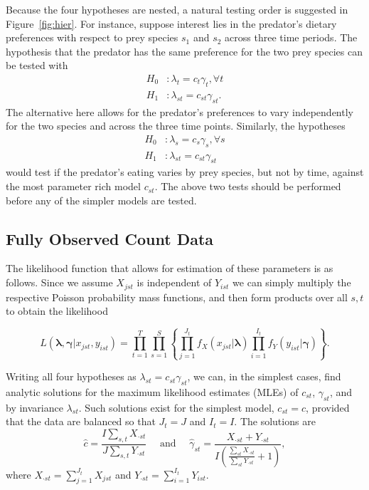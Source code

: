 \documentclass[smallextended]{svjour3}
\begin{document}
Because the four hypotheses are nested, a natural testing order is suggested in Figure~\ref{fig:hier}.  For instance, suppose interest lies in the predator's dietary preferences with respect to prey species $s_1$ and $s_2$ across three time periods.  The hypothesis that the predator has the same preference for the two prey species can be tested with
\begin{align*}
  H_0&: \lambda_t = c_t \gamma_t, \forall t \\  
  H_1&: \lambda_{st} = c_{st}\gamma_{st}.
\end{align*}
The alternative here allows for the predator's preferences to vary independently for the two species and across the three time points. Similarly, the hypotheses
\begin{align*}
  H_0&: \lambda_s = c_s \gamma_s, \forall s \\  
  H_1&: \lambda_{st} = c_{st}\gamma_{st}
\end{align*}
would test if the predator's eating varies by prey species, but not by time, against the most parameter rich model $c_{st}$.  The above two tests should be performed before any of the simpler models are tested.

\subsection{Fully Observed Count Data}
\label{sec:count}

The likelihood function that allows for estimation of these parameters is as follows.  Since we assume $X_{jst}$ is independent of $Y_{ist}$ we can simply multiply the respective Poisson probability mass functions, and then form products over all $s,t$ to obtain the likelihood

\begin{equation}
  \label{eq:likelihood}
 L( \boldsymbol{\lambda}, \boldsymbol{\gamma} | x_{jst}, y_{ist}) = \prod_{t = 1}^{T} \prod_{s=1}^S \left\{ \prod_{j=1}^{J_t} f_X(x_{jst}|\boldsymbol{\lambda}) \prod_{i=1}^{I_t} f_Y(y_{ist} | \boldsymbol{\gamma}) \right\}.
\end{equation}

\noindent Writing all four hypotheses as $\lambda_{st} = c_{st}\gamma_{st}$, we can, in the simplest cases, find analytic solutions for the maximum likelihood estimates (MLEs) of $c_{st}$, $\gamma_{st}$, and by invariance $\lambda_{st}$.  Such solutions exist for the simplest model, $c_{st}=c$, provided that the data are balanced so that $J_t=J$ and $I_t=I$.  The solutions are
\begin{equation*}
  \hat{c} = \frac{I \sum_{s,t} X_{\cdot st}}{J \sum_{s,t} Y_{\cdot st}}
  \quad
  \text{ and }
  \quad
  \hat{\gamma}_{st} = \frac{X_{\cdot st} + Y_{\cdot st}}{I \left( \frac{\sum_{st} X_{\cdot st}}{\sum_{st} Y_{\cdot st}} + 1 \right)},
\end{equation*}
where $X_{\cdot st} = \sum_{j=1}^{J_t}X_{jst}$ and $Y_{\cdot st} = \sum_{i=1}^{I_t} Y_{ist}$.
\end{document}
